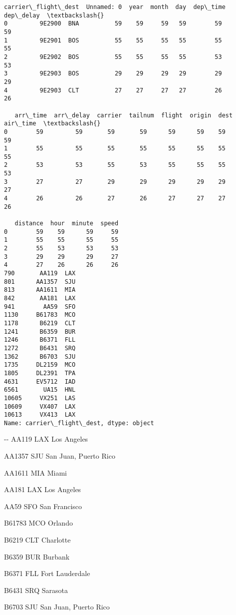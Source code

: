 \documentclass[11pt]{article}
\begin{document}
    \begin{Verbatim}[commandchars=\\\{\}]
  carrier\_flight\_dest  Unnamed: 0  year  month  day  dep\_time  dep\_delay  \textbackslash{}
0         9E2900  BNA          59    59     59   59        59         59   
1         9E2901  BOS          55    55     55   55        55         55   
2         9E2902  BOS          55    55     55   55        53         53   
3         9E2903  BOS          29    29     29   29        29         29   
4         9E2903  CLT          27    27     27   27        26         26   

   arr\_time  arr\_delay  carrier  tailnum  flight  origin  dest  air\_time  \textbackslash{}
0        59         59       59       59      59      59    59        59   
1        55         55       55       55      55      55    55        55   
2        53         53       55       53      55      55    55        53   
3        27         27       29       29      29      29    29        27   
4        26         26       27       26      27      27    27        26   

   distance  hour  minute  speed  
0        59    59      59     59  
1        55    55      55     55  
2        55    53      53     53  
3        29    29      29     27  
4        27    26      26     26  
790       AA119  LAX
801      AA1357  SJU
813      AA1611  MIA
842       AA181  LAX
941        AA59  SFO
1130     B61783  MCO
1178      B6219  CLT
1241      B6359  BUR
1246      B6371  FLL
1272      B6431  SRQ
1362      B6703  SJU
1735     DL2159  MCO
1805     DL2391  TPA
4631     EV5712  IAD
6561       UA15  HNL
10605     VX251  LAS
10609     VX407  LAX
10613     VX413  LAX
Name: carrier\_flight\_dest, dtype: object

    \end{Verbatim}

    -\/- AA119 LAX Los Angeles

AA1357 SJU San Juan, Puerto Rico

AA1611 MIA Miami

AA181 LAX Los Angeles

AA59 SFO San Francisco

B61783 MCO Orlando

B6219 CLT Charlotte

B6359 BUR Burbank

B6371 FLL Fort Lauderdale

B6431 SRQ Sarasota

B6703 SJU San Juan, Puerto Rico
\end{document}
